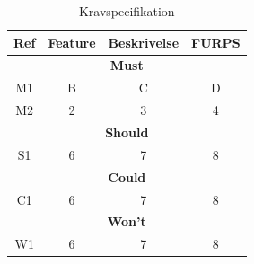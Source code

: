 \documentclass{article}
\begin{document}
  \begin{table}[h]
  \centering
  \begin{tabular}{|c|c|c|c|}

  \hline
  Ref & Feature & Beskrivelse & FURPS \\
  \hline


  \multicolumn{4}{|c|}{\textbf{Must}} \\
  \hline
  M1 & B & C & D \\
  \hline
  M2 & 2 & 3 & 4 \\
  \hline
  
  \multicolumn{4}{|c|}{\textbf{Should}} \\
  \hline
  S1 & 6 & 7 & 8 \\
  \hline

  \multicolumn{4}{|c|}{\textbf{Could}} \\
  \hline
  C1 & 6 & 7 & 8 \\
  \hline
  
  \multicolumn{4}{|c|}{\textbf{Won't}} \\
  \hline
  W1 & 6 & 7 & 8 \\
  \hline

  \end{tabular}
  \caption{Kravspecifikation}
  \end{table}
\end{document}

